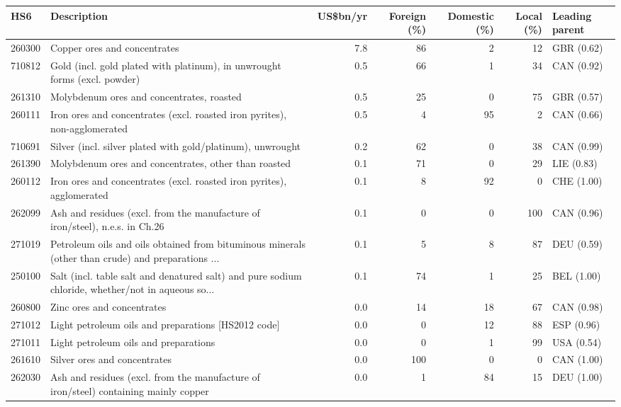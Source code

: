 \begin{tabular}{@{}l p{6.4cm} r r r r l@{}}
\toprule
HS6 & Description & US\$bn/yr & Foreign (\%) & Domestic (\%) & Local (\%) & Leading parent \\
\midrule
260300 & Copper ores and concentrates & 7.8 & 86 & 2 & 12 & GBR (0.62) \\
710812 & Gold (incl. gold plated with platinum), in unwrought forms (excl. powder) & 0.5 & 66 & 1 & 34 & CAN (0.92) \\
261310 & Molybdenum ores and concentrates, roasted & 0.5 & 25 & 0 & 75 & GBR (0.57) \\
260111 & Iron ores and concentrates (excl. roasted iron pyrites), non-agglomerated & 0.5 & 4 & 95 & 2 & CAN (0.66) \\
710691 & Silver (incl. silver plated with gold/\allowbreak{}platinum), unwrought & 0.2 & 62 & 0 & 38 & CAN (0.99) \\
261390 & Molybdenum ores and concentrates, other than roasted & 0.1 & 71 & 0 & 29 & LIE (0.83) \\
260112 & Iron ores and concentrates (excl. roasted iron pyrites), agglomerated & 0.1 & 8 & 92 & 0 & CHE (1.00) \\
262099 & Ash and residues (excl. from the manufacture of iron/\allowbreak{}steel), n.e.s. in Ch.26 & 0.1 & 0 & 0 & 100 & CAN (0.96) \\
271019 & Petroleum oils and oils obtained from bituminous minerals (other than crude) and preparations ... & 0.1 & 5 & 8 & 87 & DEU (0.59) \\
250100 & Salt (incl. table salt and denatured salt) and pure sodium chloride, whether/\allowbreak{}not in aqueous so... & 0.1 & 74 & 1 & 25 & BEL (1.00) \\
260800 & Zinc ores and concentrates & 0.0 & 14 & 18 & 67 & CAN (0.98) \\
271012 & Light petroleum oils and preparations [HS2012 code] & 0.0 & 0 & 12 & 88 & ESP (0.96) \\
271011 & Light petroleum oils and preparations & 0.0 & 0 & 1 & 99 & USA (0.54) \\
261610 & Silver ores and concentrates & 0.0 & 100 & 0 & 0 & CAN (1.00) \\
262030 & Ash and residues (excl. from the manufacture of iron/\allowbreak{}steel) containing mainly copper & 0.0 & 1 & 84 & 15 & DEU (1.00) \\
\bottomrule
\end{tabular}
